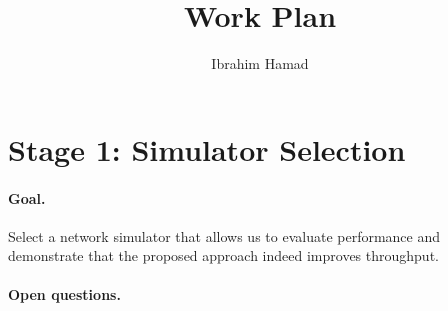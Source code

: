 \documentclass[12pt]{article}
\title{Work Plan}
\author{Ibrahim Hamad}
\date{}
\begin{document}
\maketitle


\section*{Stage 1: Simulator Selection}

\paragraph{Goal.}
Select a network simulator that allows us to evaluate performance and demonstrate that the proposed approach indeed improves throughput.

\paragraph{Open questions.}
\end{document}
